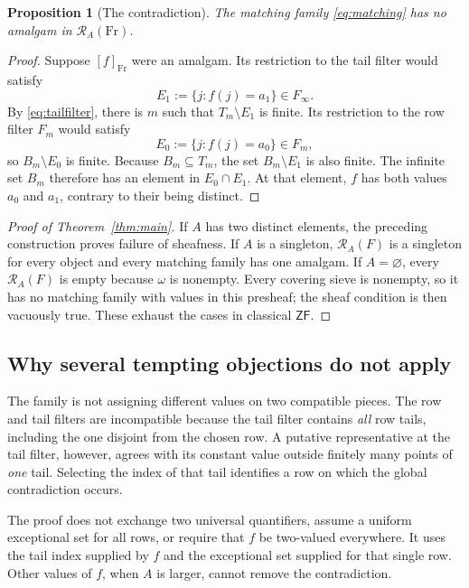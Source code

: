 \documentclass[11pt,letterpaper]{article}
\newtheorem{proposition}[theorem]{Proposition}
\theoremstyle{definition}
\theoremstyle{remark}
\newcommand{\om}{\omega}
\newcommand{\Fr}{\mathrm{Fr}}
\newcommand{\RA}{\mathscr R_A}
\newcommand{\ZF}{\mathsf{ZF}}
\begin{document}
\begin{proposition}[The contradiction]\label{prop:contradiction}
The matching family \eqref{eq:matching} has no amalgam in $\RA(\Fr)$.
\end{proposition}
\begin{proof}
Suppose $[f]_{\Fr}$ were an amalgam. Its restriction to the tail filter
would satisfy
\[
 E_1:=\{j:f(j)=a_1\}\in F_\infty.
\]
By \eqref{eq:tailfilter}, there is $m$ such that $T_m\setminus E_1$ is
finite. Its restriction to the row filter $F_m$ would satisfy
\[
 E_0:=\{j:f(j)=a_0\}\in F_m,
\]
so $B_m\setminus E_0$ is finite. Because $B_m\subseteq T_m$, the set
$B_m\setminus E_1$ is also finite. The infinite set $B_m$ therefore
has an element in $E_0\cap E_1$. At that element, $f$ has both values
$a_0$ and $a_1$, contrary to their being distinct.
\end{proof}

\begin{proof}[Proof of Theorem~\ref{thm:main}]
If $A$ has two distinct elements, the preceding construction proves
failure of sheafness. If $A$ is a singleton, $\RA(F)$ is a singleton
for every object and every matching family has one amalgam. If
$A=\varnothing$, every $\RA(F)$ is empty because $\om$ is nonempty.
Every covering sieve is nonempty, so it has no matching family with
values in this presheaf; the sheaf condition is then vacuously true.
These exhaust the cases in classical $\ZF$.
\end{proof}

\subsection{Why several tempting objections do not apply}
The family is not assigning different values on two compatible pieces.
The row and tail filters are incompatible because the tail filter contains
\emph{all} row tails, including the one disjoint from the chosen row. A
putative representative at the tail filter, however, agrees with its
constant value outside finitely many points of \emph{one} tail. Selecting
the index of that tail identifies a row on which the global contradiction
occurs.

The proof does not exchange two universal quantifiers, assume a uniform
exceptional set for all rows, or require that $f$ be two-valued everywhere.
It uses the tail index supplied by $f$ and the exceptional set supplied
for that single row. Other values of $f$, when $A$ is larger, cannot
remove the contradiction.
\end{document}
